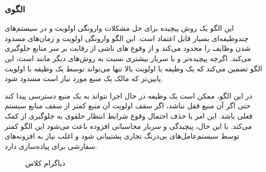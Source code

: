 \subsubsection{الگوی }
\label{resourcePriorCeilSec}
\begin{RTL}
این الگو \cite{ref4}
یک روش پیچیده برای حل مشکلات وارونگی اولویت
و  در سیستم‌های چندوظیفه‌ای بسیار قابل اعتماد است.
این الگو وارونگی اولویت و زمان‌های مسدود شدن وظایف را محدود می‌کند
و از وقوع های ناشی از رقابت بر سر منابع جلوگیری می‌کند.
اگرچه پیچیده‌تر و با سربار بیشتری نسبت به روش‌های دیگر مانند
 است، این الگو تضمین می‌کند
که یک وظیفه با اولویت بالا تنها می‌تواند توسط یک وظیفه با اولویت پایین‌تر
که مالک یک منبع مورد نیاز است مسدود شود.
\end{RTL}
\begin{RTL}
در این الگو، ممکن است یک وظیفه در حال اجرا نتواند
به یک منبع دسترسی پیدا کند حتی اگر آن منبع قفل نباشد،
اگر سقف اولویت آن منبع کمتر از سقف منابع سیستم فعلی باشد.
این امر با حذف احتمال وقوع شرایط انتظار حلقوی
به جلوگیری از  کمک می‌کند.
با این حال، پیچیدگی و سربار محاسباتی افزوده باعث می‌شود این الگو کمتر توسط
سیستم‌عامل‌های بی‌درنگ تجاری پشتیبانی شود
و اغلب نیاز به افزونه‌های سفارشی برای پیاده‌سازی دارد.
\end{RTL}
\begin{figure}[h!]
\centering
{}
\caption{دیاگرام کلاس }
\label{resourcePriorCeilClassDiag}
\end{figure}